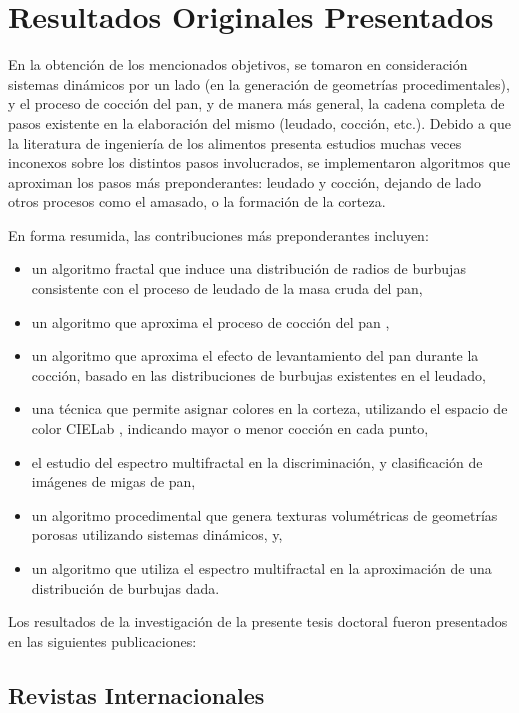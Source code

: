 \section{Resultados Originales Presentados}
En la obtención de los mencionados objetivos, se tomaron en consideración sistemas dinámicos por un lado (en la generación de geometrías procedimentales), y el proceso de cocción del pan, y de manera más general, la cadena completa de pasos existente en la elaboración del mismo (leudado, cocción, etc.).
Debido a que la literatura de ingeniería de los alimentos presenta estudios muchas veces inconexos sobre los distintos pasos involucrados, se implementaron algoritmos que aproximan los pasos más preponderantes: leudado y cocción, dejando de lado otros procesos como el amasado, o la formación de la corteza.

En forma resumida, las contribuciones más preponderantes incluyen:
\begin{itemize}
\item un algoritmo fractal \cite{Mandelbrot1983} que induce una distribución de radios de burbujas consistente con el proceso de leudado de la masa cruda del pan,
\item un algoritmo que aproxima el proceso de cocción del pan \cite{Powathil2004},
\item un algoritmo que aproxima el efecto de levantamiento del pan durante la cocción, basado en las distribuciones de burbujas existentes en el leudado,
\item una técnica que permite asignar colores en la corteza, utilizando el espacio de color CIELab \cite{Hunter58}, indicando mayor o menor cocción en cada punto,
\item el estudio del espectro multifractal \cite{Xu2009} en la discriminación, y clasificación de imágenes de migas de pan,
\item un algoritmo procedimental que genera texturas volumétricas de geometrías porosas utilizando sistemas dinámicos, y,
\item un algoritmo que utiliza el espectro multifractal en la aproximación de una distribución de burbujas dada.
\end{itemize}

Los resultados de la investigación de la presente tesis doctoral fueron presentados en las siguientes publicaciones:

\subsection*{Revistas Internacionales}

